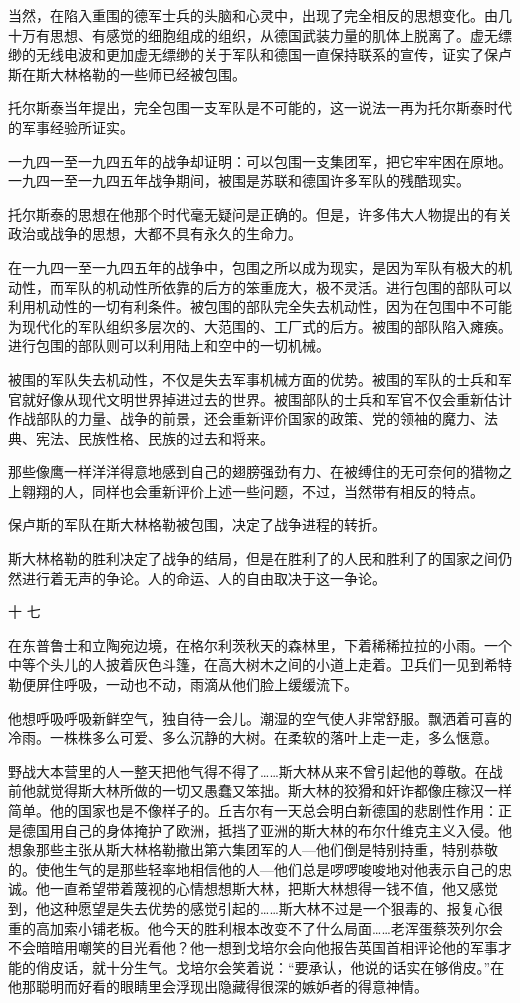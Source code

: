 当然，在陷入重围的德军士兵的头脑和心灵中，出现了完全相反的思想变化。由几十万有思想、有感觉的细胞组成的组织，从德国武装力量的肌体上脱离了。虚无缥缈的无线电波和更加虚无缥缈的关于军队和德国一直保持联系的宣传，证实了保卢斯在斯大林格勒的一些师已经被包围。

托尔斯泰当年提出，完全包围一支军队是不可能的，这一说法一再为托尔斯泰时代的军事经验所证实。

一九四一至一九四五年的战争却证明：可以包围一支集团军，把它牢牢困在原地。一九四一至一九四五年战争期间，被围是苏联和德国许多军队的残酷现实。

托尔斯泰的思想在他那个时代毫无疑问是正确的。但是，许多伟大人物提出的有关政治或战争的思想，大都不具有永久的生命力。

在一九四一至一九四五年的战争中，包围之所以成为现实，是因为军队有极大的机动性，而军队的机动性所依靠的后方的笨重庞大，极不灵活。进行包围的部队可以利用机动性的一切有利条件。被包围的部队完全失去机动性，因为在包围中不可能为现代化的军队组织多层次的、大范围的、工厂式的后方。被围的部队陷入瘫痪。进行包围的部队则可以利用陆上和空中的一切机械。

被围的军队失去机动性，不仅是失去军事机械方面的优势。被围的军队的士兵和军官就好像从现代文明世界掉进过去的世界。被围部队的士兵和军官不仅会重新估计作战部队的力量、战争的前景，还会重新评价国家的政策、党的领袖的魔力、法典、宪法、民族性格、民族的过去和将来。

那些像鹰一样洋洋得意地感到自己的翅膀强劲有力、在被缚住的无可奈何的猎物之上翱翔的人，同样也会重新评价上述一些问题，不过，当然带有相反的特点。

保卢斯的军队在斯大林格勒被包围，决定了战争进程的转折。

斯大林格勒的胜利决定了战争的结局，但是在胜利了的人民和胜利了的国家之间仍然进行着无声的争论。人的命运、人的自由取决于这一争论。

十 七

在东普鲁士和立陶宛边境，在格尔利茨秋天的森林里，下着稀稀拉拉的小雨。一个中等个头儿的人披着灰色斗篷，在高大树木之间的小道上走着。卫兵们一见到希特勒便屏住呼吸，一动也不动，雨滴从他们脸上缓缓流下。

他想呼吸呼吸新鲜空气，独自待一会儿。潮湿的空气使人非常舒服。飘洒着可喜的冷雨。一株株多么可爱、多么沉静的大树。在柔软的落叶上走一走，多么惬意。

野战大本营里的人一整天把他气得不得了……斯大林从来不曾引起他的尊敬。在战前他就觉得斯大林所做的一切又愚蠢又笨拙。斯大林的狡猾和奸诈都像庄稼汉一样简单。他的国家也是不像样子的。丘吉尔有一天总会明白新德国的悲剧性作用：正是德国用自己的身体掩护了欧洲，抵挡了亚洲的斯大林的布尔什维克主义入侵。他想象那些主张从斯大林格勒撤出第六集团军的人—他们倒是特别持重，特别恭敬的。使他生气的是那些轻率地相信他的人—他们总是啰啰唆唆地对他表示自己的忠诚。他一直希望带着蔑视的心情想想斯大林，把斯大林想得一钱不值，他又感觉到，他这种愿望是失去优势的感觉引起的……斯大林不过是一个狠毒的、报复心很重的高加索小铺老板。他今天的胜利根本改变不了什么局面……老浑蛋蔡茨列尔会不会暗暗用嘲笑的目光看他？他一想到戈培尔会向他报告英国首相评论他的军事才能的俏皮话，就十分生气。戈培尔会笑着说：“要承认，他说的话实在够俏皮。”在他那聪明而好看的眼睛里会浮现出隐藏得很深的嫉妒者的得意神情。

